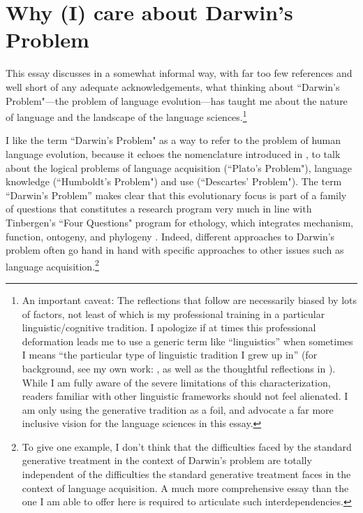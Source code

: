 \chapter{Why (I) care about Darwin's Problem}

This essay discusses in a somewhat informal way, with far too few references and well short of any adequate acknowledgements, what thinking about ``Darwin's Problem"---the problem of language evolution---has taught me about the nature of language and the landscape of the language sciences.\footnote{An important caveat: The reflections that follow are necessarily biased by lots of factors, not least of which is my professional training in a particular linguistic/cognitive tradition. I apologize if at times this professional deformation leads me to use a generic term like ``linguistics'' when sometimes I means ``the particular type of linguistic tradition I grew up in'' (for background, see my own work: \cite{boeckx2006linguistic,boeckx2009language}, as well as the thoughtful reflections in \cite{marantz2019linguists}). While I am fully aware of the severe limitations of this characterization, readers familiar with other linguistic frameworks should not feel alienated. I am only using the generative tradition as a foil, and advocate a far more inclusive vision for the language sciences in this essay.}

I like the term ``Darwin's Problem" as a way to refer to the problem of human language evolution, because it echoes the nomenclature introduced in \cite{chomsky1986knowledge}, to talk about the logical problems of language acquisition (``Plato's Problem"), language knowledge (``Humboldt's Problem") and use (``Descartes' Problem"). The term ``Darwin's Problem'' makes clear that this evolutionary focus is part of a family of questions that constitutes a research program very much in line with Tinbergen's ``Four Questions" program for ethology, which integrates mechanism, function, ontogeny, and phylogeny \citep{tinbergen1963aims}. Indeed, different approaches to Darwin's problem often go hand in hand with specific approaches to other issues such as language acquisition.\footnote{To give one example, I don't think that the difficulties faced by the standard generative treatment in the context of Darwin's problem are totally independent of the difficulties the standard generative treatment faces in the context of language acquisition. A much more comprehensive essay than the one I am able to offer here is required to articulate such interdependencies.}

